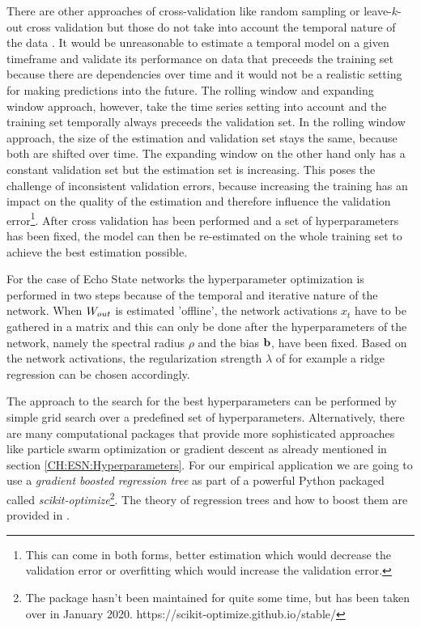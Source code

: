 There are other approaches of cross-validation like random sampling or leave-$k$-out cross validation but those do not take into account the temporal nature of the data \citep{hastie01statisticallearning}. It would be unreasonable to estimate a temporal model on a given timeframe and validate its performance on data that preceeds the training set because there are dependencies over time and it would not be a realistic setting for making predictions into the future.
The rolling window and expanding window approach, however, take the time series setting into account and the training set temporally always preceeds the validation set. In the rolling window approach, the size of the estimation and validation set stays the same, because both are shifted over time. The expanding window on the other hand only has a constant validation set but the estimation set is increasing. This poses the challenge of inconsistent validation errors, because increasing the training has an impact on the quality of the estimation and therefore influence the validation error\footnote{This can come in both forms, better estimation which would decrease the validation error or overfitting which would increase the validation error.}. After cross validation has been performed and a set of hyperparameters has been fixed, the model can then be re-estimated on the whole training set to achieve the best estimation possible.

For the case of Echo State networks the hyperparameter optimization is performed in two steps because of the temporal and iterative nature of the network. When $W_{out}$ is estimated 'offline', the network activations $x_t$ have to be gathered in a matrix and this can only be done after the hyperparameters of the network, namely the spectral radius $\rho$ and the bias ${\bf b}$, have been fixed. Based on the network activations, the regularization strength $\lambda$ of for example a ridge regression can be chosen accordingly.

The approach to the search for the best hyperparameters can be performed by simple grid search over a predefined set of hyperparameters. Alternatively, there are many computational packages that provide more sophisticated approaches like particle swarm optimization \citep{basterrech2015experimental} or gradient descent \citep{JAEGER2007335} as already mentioned in section \ref{CH:ESN:Hyperparameters}. For our empirical application we are going to use a \textit{gradient boosted regression tree} as part of a powerful Python packaged called \textit{scikit-optimize}\footnote{The package hasn't been maintained for quite some time, but has been taken over in January 2020. https://scikit-optimize.github.io/stable/}. The theory of regression trees and how to boost them are provided in \cite{hastie01statisticallearning}.


